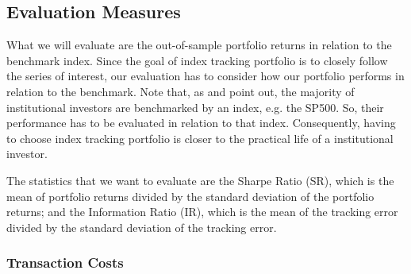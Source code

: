 \documentclass[preprint,authoryear,review,12pt]{elsarticle}
\begin{document}
\subsection{Evaluation Measures} %

What we will evaluate are the out-of-sample portfolio returns in relation to the benchmark index.
Since the goal of index tracking portfolio is to closely follow the series of interest, our evaluation has to consider how our portfolio performs in relation to the benchmark.
Note that, as \cite{tz2011} and \cite{liu-2009} point out, the majority of institutional investors are benchmarked by an index, e.g. the SP500.
So, their performance has to be evaluated in relation to that index.
Consequently, having to choose index tracking portfolio is closer to the practical life of a institutional investor.


The statistics that we want to evaluate are the Sharpe Ratio (SR), which is the mean of portfolio returns divided by the standard deviation of the portfolio returns; and the Information Ratio (IR), which is the mean of the tracking error divided by the standard deviation of the tracking error.


% 

\subsubsection*{Transaction Costs}
\end{document}
